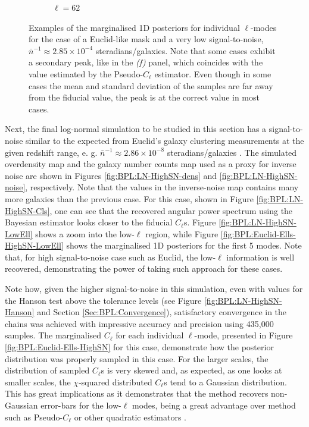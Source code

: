 \begin{figure}
\begin{subfigure}{.5\textwidth}
  \caption{$\ell = 62$}
\end{subfigure}
\caption[Examples of marginalised 1D posteriors for individual $\ell$-modes for the case of a Euclid-like mask and a very low signal-to-noise.]{Examples of the marginalised 1D posteriors for individual $\ell$-modes for the case of a Euclid-like mask and a very low signal-to-noise, $\bar{n}^{-1}\approx 2.85\times 10^{-4}$ steradians/galaxies. Note that some cases exhibit a secondary peak, like in the \textit{(f)} panel, which coincides with the value estimated by the Pseudo-$C_{\ell}$ estimator. Even though in some cases the mean and standard deviation of the samples are far away from the fiducial value, the peak is at the correct value in most cases.}
\label{fig:BPL:Euclid-Ells}
\end{figure}

\qquad Next, the final log-normal simulation to be studied in this section has a signal-to-noise similar to the expected from Euclid's galaxy clustering measurements at the given redshift range, e. g. $\bar{n}^{-1}\approx 2.86\times 10^{-8}$ steradians/galaxies \citep{2011EuclidRedPaper}. The simulated overdensity map and the galaxy number counts map used as a proxy for inverse noise are shown in Figures \ref{fig:BPL:LN-HighSN-dens} and \ref{fig:BPL:LN-HighSN-noise}, respectively. Note that the values in the inverse-noise map contains many more galaxies than the previous case. For this case, shown in Figure \ref{fig:BPL:LN-HighSN-Cls}, one can see that the recovered angular power spectrum using the Bayesian estimator looks closer to the fiducial $C_{\ell}$s. Figure \ref{fig:BPL:LN-HighSN-LowEll} shows a zoom into the low-$\ell$ region, while Figure \ref{fig:BPL:Euclid-Ells-HighSN-LowEll} shows the marginalised 1D posteriors for the first 5 modes. Note that, for high signal-to-noise case such as Euclid, the low-$\ell$ information is well recovered, demonstrating the power of taking such approach for these cases.

\qquad Note how, given the higher signal-to-noise in this simulation, even with values for the Hanson test above the tolerance levels (see Figure \ref{fig:BPL:LN-HighSN-Hanson} and Section \ref{Sec:BPL:Convergence}), satisfactory convergence in the chains was achieved with impressive accuracy and precision using 435,000 samples. The marginalised $C_{\ell}$ for each individual $\ell$-mode, presented in Figure \ref{fig:BPL:Euclid-Ells-HighSN} for this case, demonstrate how the posterior distribution was properly sampled in this case. For the larger scales, the distribution of sampled $C_{\ell}$s is very skewed and, as expected, as one looks at smaller scales, the $\chi$-squared distributed $C_{\ell}$s tend to a Gaussian distribution. This has great implications as it demonstrates that the method recovers non-Gaussian error-bars for the low-$\ell$ modes, being a great advantage over method such as Pseudo-$C_{\ell}$ or other quadratic estimators \citep{Efstat2004,Boris2013}.

